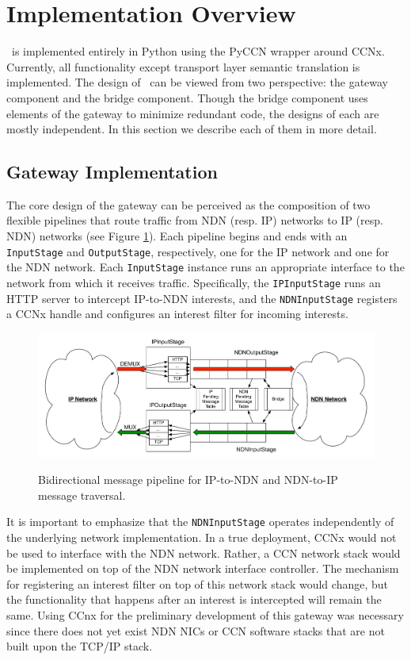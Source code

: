 \section{Implementation Overview}
\sink\ is implemented entirely in Python using the PyCCN \cite{pyccn} wrapper around CCNx. Currently, all functionality except transport layer semantic translation is implemented. The design of \sink\ can be viewed from two perspective: the gateway component and the bridge component. Though the bridge component uses elements of the gateway to minimize redundant code, the designs of each are mostly independent. In this section we describe each of them in more detail. 

\subsection{Gateway Implementation}
The core design of the gateway can be perceived as the composition of two flexible pipelines that route traffic from NDN (resp. IP) networks to IP (resp. NDN) networks (see Figure \ref{fig:pipeline}). Each pipeline begins and ends with an {\tt InputStage} and {\tt OutputStage}, respectively, one for the IP network and one for the NDN network. Each {\tt InputStage} instance runs an appropriate interface to the network from which it receives traffic. Specifically, the {\tt IPInputStage} runs an HTTP server to intercept IP-to-NDN interests, and the {\tt NDNInputStage} registers a CCNx handle and configures an interest filter for incoming interests. 

\begin{figure}[ht!]
\begin{center}
\includegraphics[scale=0.45]{./images/pipeline.pdf}
\label{fig:pipeline}
\caption{Bidirectional message pipeline for IP-to-NDN and NDN-to-IP message traversal.}
\end{center}
\end{figure}

It is important to emphasize that the {\tt NDNInputStage} operates independently of the underlying network implementation. In a true deployment, CCNx would not be used to interface with the NDN network. Rather, a CCN network stack would be implemented on top of the NDN network interface controller. The mechanism for registering an interest filter on top of this network stack would change, but the functionality that happens after an interest is intercepted will remain the same. Using CCnx for the preliminary development of this gateway was necessary since there does not yet exist NDN NICs or CCN software stacks that are not built upon the TCP/IP stack.

